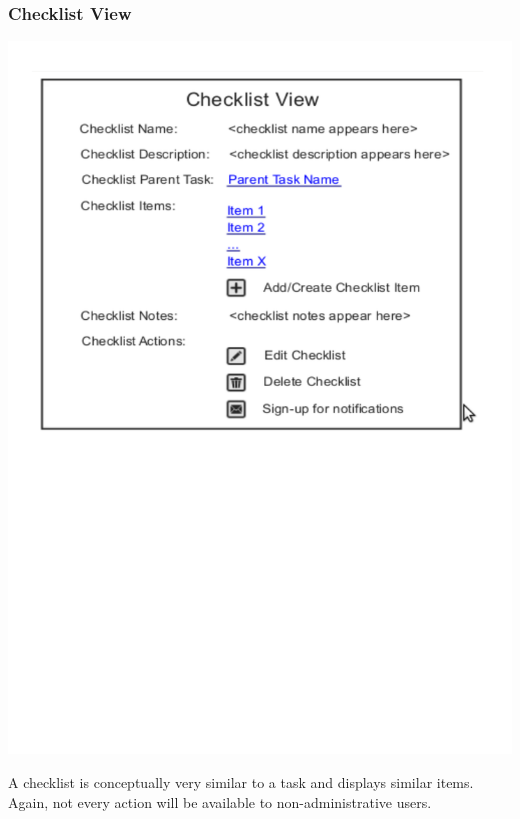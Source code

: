 \documentclass{article}
\begin{document}
\subsubsection{Checklist View}
\begin{center}
\includegraphics[trim = 0cm 12cm 0cm 0cm, clip=true, scale=0.7]{images/checklistview}
\end{center}
A checklist is conceptually very similar to a task and displays similar items.
Again, not every action will be available to non-administrative users.
\end{document}
